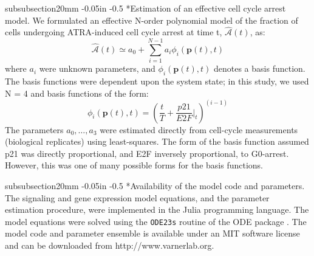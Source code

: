 \documentclass[12pt]{article}
\makeatletter
\renewcommand\subsubsection{\@startsection
	{subsubsection}{2}{0mm}
	{-0.05in}
	{-0.5\baselineskip}
	{\normalfont\normalsize\itshape}}
\makeatother
\begin{document}
\subsubsection*{Estimation of an effective cell cycle arrest model.}
We formulated an effective N-order polynomial model of the fraction of cells undergoing ATRA-induced cell cycle arrest at time t, $\hat{\mathcal{A}}(t)$, as:
\begin{equation}\label{eq:a-eqn}
	\hat{\mathcal{A}}\left(t\right)\simeq a_{0}+\sum_{i=1}^{N-1}a_{i}\phi_{i}\left(\mathbf{p}(t),t\right)
\end{equation}where $a_{i}$ were unknown parameters, and $\phi_{i}\left(\mathbf{p}(t),t\right)$ denotes a basis function.
The basis functions were dependent upon the system state; in this study, we used N = 4 and basis functions of the form:
\begin{equation}
	\phi_{i}\left(\mathbf{p}(t),t\right) = \left(\frac{t}{T}+\frac{p21}{E2F}\Bigr|_{t}\right)^{(i-1)}
\end{equation}
The parameters $a_{0},\hdots,a_{3}$ were estimated directly from cell-cycle measurements (biological replicates) using least-squares.
The form of the basis function assumed p21 was directly proportional, and E2F inversely proportional, to G0-arrest.
However, this was one of many possible forms for the basis functions.


\subsubsection*{Availability of the model code and parameters.}
The signaling and gene expression model equations, and the parameter estimation procedure, were implemented in the Julia programming language.
The model equations were solved using the \texttt{ODE23s} routine of the ODE package \cite{Julia}.
The model code and parameter ensemble is available under an MIT software license and can be downloaded from http://www.varnerlab.org.
\end{document}
